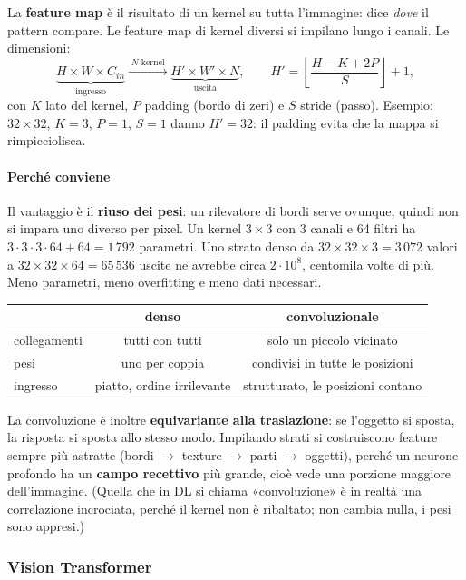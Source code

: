 \documentclass[12pt]{extarticle}
\begin{document}
\noindent La \textbf{feature map} è il risultato di un kernel su tutta l'immagine: dice \emph{dove} il pattern compare. Le feature map di kernel diversi si impilano lungo i canali. Le dimensioni:
\[
\underbrace{H\times W\times C_{in}}_{\text{ingresso}}\xrightarrow{\;N\text{ kernel}\;}\underbrace{H'\times W'\times N}_{\text{uscita}},
\qquad
H'=\left\lfloor\frac{H-K+2P}{S}\right\rfloor+1,
\]
con $K$ lato del kernel, $P$ padding (bordo di zeri) e $S$ stride (passo). Esempio: $32\times32$, $K=3$, $P=1$, $S=1$ danno $H'=32$: il padding evita che la mappa si rimpicciolisca.

\paragraph{Perché conviene}
Il vantaggio è il \textbf{riuso dei pesi}: un rilevatore di bordi serve ovunque, quindi non si impara uno diverso per pixel. Un kernel $3\times3$ con 3 canali e 64 filtri ha $3\cdot3\cdot3\cdot64+64=1\,792$ parametri. Uno strato denso da $32\times32\times3=3\,072$ valori a $32\times32\times64=65\,536$ uscite ne avrebbe circa $2\cdot10^8$, centomila volte di più. Meno parametri, meno overfitting e meno dati necessari.

\begin{center}
\small
\begin{tabular}{lcc}
    \toprule
    & \textbf{denso} & \textbf{convoluzionale} \\
    \midrule
    collegamenti & tutti con tutti & solo un piccolo vicinato \\
    pesi & uno per coppia & condivisi in tutte le posizioni \\
    ingresso & piatto, ordine irrilevante & strutturato, le posizioni contano \\
    \bottomrule
\end{tabular}
\end{center}

\noindent La convoluzione è inoltre \textbf{equivariante alla traslazione}: se l'oggetto si sposta, la risposta si sposta allo stesso modo. Impilando strati si costruiscono feature sempre più astratte (bordi $\to$ texture $\to$ parti $\to$ oggetti), perché un neurone profondo ha un \textbf{campo recettivo} più grande, cioè vede una porzione maggiore dell'immagine. (Quella che in DL si chiama «convoluzione» è in realtà una correlazione incrociata, perché il kernel non è ribaltato; non cambia nulla, i pesi sono appresi.)

\subsubsection{Vision Transformer}
\end{document}
